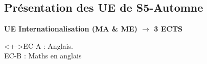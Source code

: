 \documentclass{beamer}
\begin{document}
  
%
%
%
%





\subsection{Présentation des UE de S5-Automne}
\begin{frame}
{\bf UE Internationalisation (MA \& ME) $\to$ 3 ECTS}

\begin{block}<+->{EC-A  : Anglais.  \\  EC-B  : Maths en anglais}

\end{block}

 
\end{frame}
\end{document}
